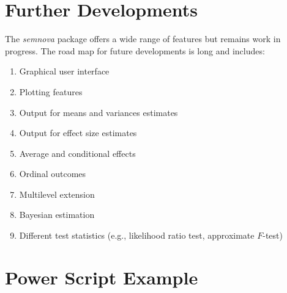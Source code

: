 \documentclass[
]{book}
\providecommand{\tightlist}{%
  \setlength{\itemsep}{0pt}\setlength{\parskip}{0pt}}
\newlength{\cslhangindent}
\newlength{\cslentryspacingunit} %
\newenvironment{CSLReferences}[2] %
 {%
  \setlength{\parindent}{0pt}
  \ifodd #1
  \let\oldpar\par
  \def\par{\hangindent=\cslhangindent\oldpar}
  \fi
  \setlength{\parskip}{#2\cslentryspacingunit}
 }%
 {}
\begin{document}
\hypertarget{further-developments}{%
\chapter{Further Developments}\label{further-developments}}

The \emph{semnova} package offers a wide range of features but remains work in progress. The road map for future developments is long and includes:

\begin{enumerate}
\def\labelenumi{\arabic{enumi}.}
\tightlist
\item
  Graphical user interface
\item
  Plotting features
\item
  Output for means and variances estimates
\item
  Output for effect size estimates
\item
  Average and conditional effects
\item
  Ordinal outcomes
\item
  Multilevel extension
\item
  Bayesian estimation
\item
  Different test statistics (e.g., likelihood ratio test, approximate \(F\)-test)
\end{enumerate}

\hypertarget{refs}{}
\begin{CSLReferences}{0}{0}
\end{CSLReferences}

\hypertarget{appendix-appendix}{%
\appendix}


\hypertarget{power-script-example}{%
\chapter{Power Script Example}\label{power-script-example}}
\end{document}
